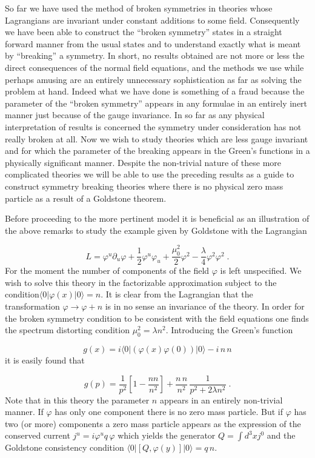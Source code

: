 \documentclass[%
  12pt,
  paper=letter,
  abstracton,
  pagesize=auto,
  version=last,
  DIV=calc
  ]{article}
\begin{document}
So far we have used the method of broken symmetries in theories whose
Lagrangians are invariant under constant additions to some field.
Consequently we have been able to construct the ``broken symmetry''
states in a straight forward manner from the usual states and to
understand exactly what is meant by ``breaking'' a symmetry.  In short,
no results obtained are not more or less the direct consequences of
the normal field equations, and the methods we use while perhaps
amusing are an entirely unnecessary sophistication as far as solving
the problem at hand.  Indeed what we have done is something of a fraud
because the parameter of the ``broken symmetry'' appears in any formulae
in an entirely inert manner just because of the gauge invariance.  In
so far as any physical interpretation of results is concerned the
symmetry under consideration has not really broken at all.  Now we
wish to study theories which are less gauge invariant and for which
the parameter of the breaking appears in the Green's functions in a
physically significant manner.  Despite the non-trivial nature of
these more complicated theories we will be able to use the preceding
results as a guide to construct symmetry breaking theories where there
is no physical zero mass particle as a result of a Goldstone theorem.

Before proceeding to the more pertinent model it is beneficial as an
illustration of the above remarks to study the example given by
Goldstone \cite{1} with the Lagrangian

\[L=\varphi^u\partial_u\varphi+\frac{1}{2}\varphi^u\varphi_u+\frac{\mu^2_0}{2}\varphi^2-\frac{\lambda}{4}\varphi^2\varphi^2\;.\]
For the moment the number of components of the field $\varphi$ is left
unspecified.  We wish to solve this theory in the factorizable
approximation subject to the condition$\langle 0|\varphi(x)|0\rangle = n$.  It is
clear from the Lagrangian that the transformation $\varphi \rightarrow
\varphi+n$ is in no sense an invariance of the theory.  In order for
the broken symmetry condition to be consistent with the field
equations one finds the spectrum distorting condition $\mu^2_0=\lambda
n^2$.  Introducing the Green's function

\[g(x)=i\langle 0|(\varphi(x)
\varphi(0))|0\rangle -i\, n\, n\]
it is easily found that

\[g(p)=\frac{1}{p^2}[1-\frac{n n}{n^2}] + \frac{n\, n}{n^2}\, \frac{1}{p^2+2\lambda n^2}\;.\]
Note that in this theory the parameter $n$ appears in an entirely
non-trivial manner.  If $\varphi$ has only one component there is no
zero mass particle.  But if $\varphi$ has two (or more) components a
zero mass particle appears as the expression of the conserved current
$j^u=i \varphi^u q\, \varphi$ which yields the generator $Q=\int d^3 x
j^0$ and the Goldstone consistency condition $\langle 0|[Q,
\varphi(y)]|0\rangle = q\, n$.
\end{document}
